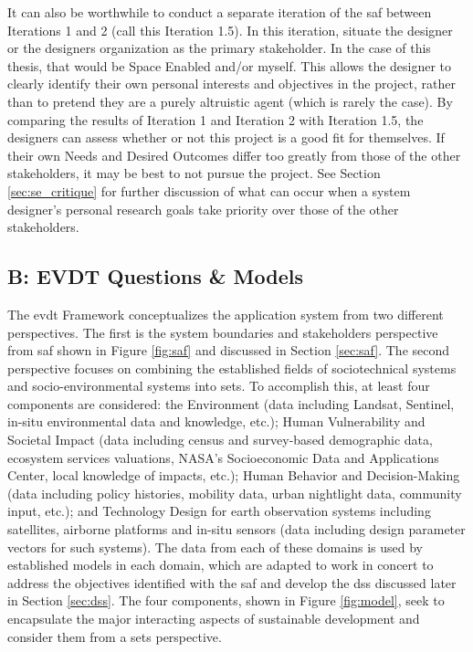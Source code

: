 It can also be worthwhile to conduct a separate iteration of the \ac{saf} between Iterations 1 and 2 (call this Iteration 1.5). In this iteration, situate the designer or the designers organization as the primary stakeholder. In the case of this thesis, that would be Space Enabled and/or myself. This allows the designer to clearly identify their own personal interests and objectives in the project, rather than to pretend they are a purely altruistic agent (which is rarely the case).
By comparing the results of Iteration 1 and Iteration 2 with Iteration 1.5, the designers can assess whether or not this project is a good fit for themselves. If their own Needs and Desired Outcomes differ too greatly from those of the other stakeholders, it may be best to not pursue the project. See Section \ref{sec:se_critique} for further discussion of what can occur when a system designer's personal research goals take priority over those of the other stakeholders.





\subsection{B: EVDT Questions \& Models} \label{sec:evdt-questions}

The \ac{evdt} Framework conceptualizes the application system from two different perspectives. The first is the system boundaries and stakeholders perspective from \ac{saf} shown in Figure \ref{fig:saf} and discussed in Section \ref{sec:saf}. The second perspective focuses on combining the established fields of sociotechnical systems \cite{rouseUnderstandingChangeComplex2012,siddiqiSociotechnicalSystemsSustainability2017,sussmanTeachingComplexSociotechnical2010} and socio-environmental systems \cite{elsawahEightGrandChallenges2020} into \ac{sets}. To accomplish this, at least four components are considered: the Environment (data including Landsat, Sentinel, in-situ environmental data and knowledge, etc.); Human Vulnerability and Societal Impact (data including census and survey-based demographic data, ecosystem services valuations, NASA's Socioeconomic Data and Applications Center, local knowledge of impacts, etc.); Human Behavior and Decision-Making (data including policy histories, mobility data, urban nightlight data, community input, etc.); and Technology Design for earth observation systems including satellites, airborne platforms and in-situ sensors (data including design parameter vectors for such systems). The data from each of these domains is used by established models in each domain, which are adapted to work in concert to address the objectives identified with the \ac{saf} and develop the \ac{dss} discussed later in Section \ref{sec:dss}. The four components, shown in Figure \ref{fig:model}, seek to encapsulate the major interacting aspects of sustainable development and consider them from a \ac{sets} perspective. 

